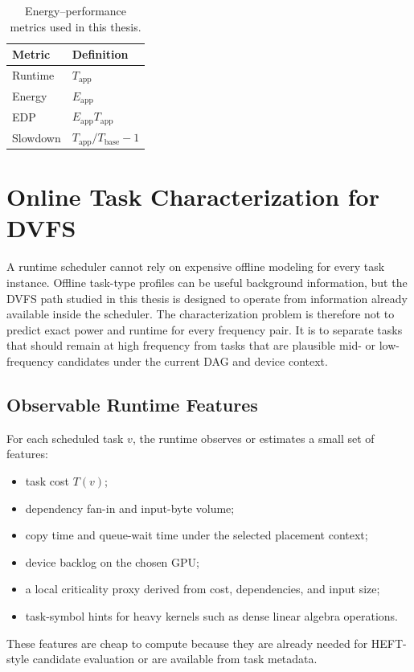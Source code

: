\begin{table}[!htbp]
\centering
\footnotesize
\begin{tabular}{@{}ll@{}}
\toprule
Metric & Definition \\
\midrule
Runtime & $T_{\mathrm{app}}$ \\
Energy & $E_{\mathrm{app}}$ \\
EDP & $E_{\mathrm{app}}T_{\mathrm{app}}$ \\
Slowdown & $T_{\mathrm{app}}/T_{\mathrm{base}} - 1$ \\
\bottomrule
\end{tabular}
\caption{Energy--performance metrics used in this thesis.}
\label{tab:energy_performance_metrics}
\end{table}

\section{Online Task Characterization for DVFS}
\label{sec:theory_task_characterization}

A runtime scheduler cannot rely on expensive offline modeling for every task instance. Offline task-type profiles can be useful background information, but the DVFS path studied in this thesis is designed to operate from information already available inside the scheduler. The characterization problem is therefore not to predict exact power and runtime for every frequency pair. It is to separate tasks that should remain at high frequency from tasks that are plausible mid- or low-frequency candidates under the current DAG and device context.

\subsection{Observable Runtime Features}
\label{subsec:observable_runtime_features}

For each scheduled task $v$, the runtime observes or estimates a small set of features:
\begin{itemize}
    \item task cost $T(v)$;
    \item dependency fan-in and input-byte volume;
    \item copy time and queue-wait time under the selected placement context;
    \item device backlog on the chosen GPU;
    \item a local criticality proxy derived from cost, dependencies, and input size;
    \item task-symbol hints for heavy kernels such as dense linear algebra operations.
\end{itemize}
These features are cheap to compute because they are already needed for HEFT-style candidate evaluation or are available from \CUDASTF{} task metadata.

